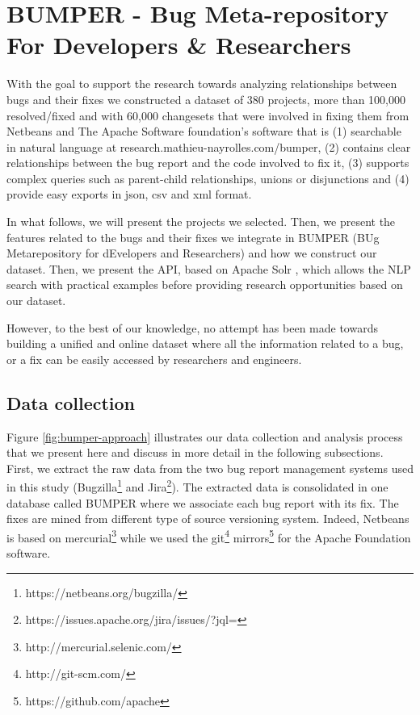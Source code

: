 
\section{BUMPER - Bug Meta-repository For Developers \& Researchers\label{sec:BUMPER}}

With the goal to support the research towards analyzing relationships between bugs and their fixes we constructed a dataset of 380 projects, more than 100,000 resolved/fixed and with 60,000 changesets that were involved in fixing them from Netbeans and The Apache Software foundation's software that is (1) searchable in natural language at research.mathieu-nayrolles.com/bumper, (2) contains clear relationships between the bug report and the code involved to fix it, (3) supports complex queries such as parent-child relationships, unions or disjunctions and (4) provide easy exports in json, csv and xml format.

In what follows, we will present the projects we selected. Then, we present the features related to the bugs and their fixes we integrate in BUMPER (BUg Metarepository for dEvelopers and Researchers) and how we construct our dataset. Then, we present the API, based on Apache Solr \cite{Nayrolles2014b}, which allows the NLP search with practical examples before providing research opportunities based on our dataset.


However, to the best of our knowledge, no attempt has been made towards building a unified and online dataset where all the information related to a bug, or a fix can be easily accessed by researchers and engineers.

\subsection{Data collection}


Figure \ref{fig:bumper-approach} illustrates our data collection and analysis process that we present here and discuss in more detail in the following subsections. First, we extract the raw data from the two bug report management systems used in this study (Bugzilla\footnote{https://netbeans.org/bugzilla/} and Jira\footnote{https://issues.apache.org/jira/issues/?jql=}). The extracted data is consolidated in one database called BUMPER where we associate each bug report with its fix. The fixes are mined from different type of source versioning system. Indeed, Netbeans is based on mercurial\footnote{ http://mercurial.selenic.com/} while we used the git\footnote{http://git-scm.com/} mirrors\footnote{https://github.com/apache} for the Apache Foundation software.

